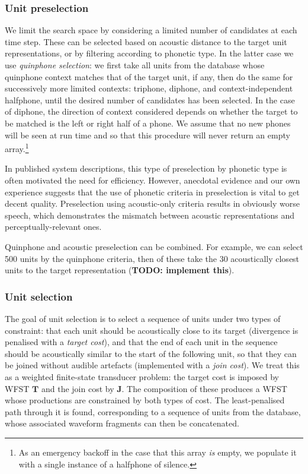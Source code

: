 \subsubsection{Unit preselection}
We limit the search space by considering a limited number of candidates at each time step.
These can be selected based on acoustic distance to the target unit representations, or by filtering according to phonetic type. 
In the latter case we use \textit{quinphone selection}: we first take all units from the database whose quinphone context matches that of the target unit, if any, then do the same for successively more limited contexts: triphone, diphone, and context-independent halfphone, until the desired number of candidates has been selected. In the case of diphone, the direction of context considered depends on whether the target to be matched is the left or right half of a phone. We assume that no new phones will be seen at run time and so that this procedure will never return an empty array.\footnote{As an emergency backoff in the case that this array \textit{is} empty, we populate it with a single instance of a halfphone of silence.}

In published system descriptions, this type of preselection by phonetic type is often motivated the need for efficiency. However, anecdotal evidence and our own experience suggests that the use of phonetic criteria in preselection is vital to get decent quality. Preselection using acoustic-only criteria results in obviously worse speech, which demonstrates the mismatch between acoustic representations and perceptually-relevant ones. 

Quinphone and acoustic preselection can be combined. For example, we can select 500 units by the quinphone criteria, then of these take the 30 acoustically closest units to the target representation (\textbf{TODO: implement this}).

\subsubsection{Unit selection}
The goal of unit selection is to select a sequence of units under two types of constraint: that each unit should be acoustically close to its target (divergence is penalised with a \textit{target cost}), and that the end of each unit in the sequence should be acoustically similar to the start of the following unit, so that they can be joined without audible artefacts (implemented with a \textit{join cost}).
We treat this as a weighted finite-state transducer problem: the target cost is imposed by WFST $\bm{T}$ and the join cost by $\bm{J}$. The composition of these produces a WFST whose productions are constrained by both types of cost. The least-penalised path through it is found, corresponding to a sequence of units from the database, whose associated waveform fragments can then be concatenated.

